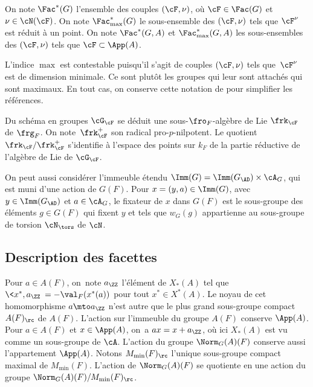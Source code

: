 On note $\Fac^*(G)$ l'ensemble des couples $(\cF,\nu)$, où $\cF\in \Fac(G)$ et $\nu\in \cN(\cF)$. On note $\Fac^*_{\max}(G)$ le sous-ensemble des $(\cF,\nu)$ tels que $\cF^{\nu}$ est réduit à un point. On note $\Fac^*(G,A)$ et $\Fac^*_{\max}(G,A)$ les sous-ensembles des $(\cF,\nu)$ tels que $\cF\subset \App(A)$.

\begin{rem*}
L'indice $\max$ est contestable puisqu'il s'agit de couples $(\cF,\nu)$ tels que~$\cF^{\nu}$ est de dimension minimale. Ce sont plutôt les groupes qui leur sont attachés qui sont maximaux. En tout cas, on conserve cette notation de \cite{W2} pour simplifier les références.
\end{rem*}

Du schéma en groupes $\cG_{\cF}$ se déduit une sous-$\fro_{F}$-algèbre de Lie $\frk_{\cF}$ de $\frg_{F}$. On note~$\frk_{\cF}^+$ son radical pro-$p$-nilpotent. Le quotient $\frk_{\cF}/\frk_{\cF}^+$ s'identifie à l'espace des points sur $k_{F}$ de la partie réductive de l'algèbre de Lie de $\cG_{\cF}$.

On peut aussi considérer l'immeuble étendu $\Imm(G)=\Imm(G_{\AD})\times \cA_{G}$, qui est muni d'une action de $G(F)$. Pour $x=(y,a)\in \Imm(G)$, avec $y\in \Imm(G_{\AD})$ et $a\in \cA_{G}$, le fixateur de $x$ dans $G(F)$ est le sous-groupe des éléments $g\in G(F)$ qui fixent $y$ et tels que $w_{G}(g)$ appartienne au sous-groupe de torsion $\cN_{\tors}$ de $\cN$.

\subsection{Description des facettes}\label{description}

Pour $a\in A(F)$, on~note $a_{\ZZ}$ l'élément de $ X_{*}(A)$ tel que $\<x^*,a_{\ZZ}\>=-\val_{F}(x^*(a))$ pour tout $x^*\in X^*(A)$. Le noyau de cet homomorphisme $a\mto a_{\ZZ}$ n'est autre que le plus grand sous-groupe compact $A(F)_{\rc}$ de $A(F)$. L'action sur l'immeuble du groupe $A(F)$ conserve $\App(A)$. Pour $a\in A(F)$ et $x\in \App(A)$, on~a $ax= x+a_{\ZZ}$, où ici $X_{*}(A)$ est vu comme un sous-groupe de $\cA$. L'action du groupe $\Norm_{G}(A)(F)$ conserve aussi l'appartement $\App(A)$. Notons $M_{\min}(F)_{\rc}$ l'unique sous-groupe compact maximal de $M_{\min}(F)$. L'action de $\Norm_{G}(A)(F)$ se quotiente en une action du groupe $\Norm_{G}(A)(F)/M_{\min}(F)_{\rc}$.

